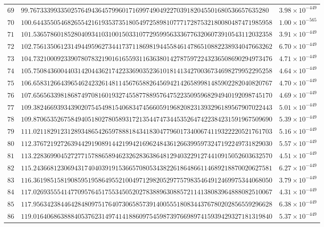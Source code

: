 \documentclass[12pt,reqno]{amsart}
\theoremstyle{remark}
\begin{document}
\begin{longtable}{clc}
$69$ & $99.7673339933502576494364579960171699749049227039182045501680536657635280$ & $3.98\times 10^{-449}$ \\
$70$ & $100.6443550546826554216193537351805497258981077717287532180080487471985958$ & $1.00\times 10^{-565}$ \\
$71$ & $101.5365786018528040934103100150331077295995633367763206073910543112032358$ & $3.91\times 10^{-449}$ \\
$72$ & $102.7561350612314944959627344173711869819445584614786510882238934047663262$ & $6.70\times 10^{-449}$ \\
$73$ & $104.7321000923390780783219016165593116363801427875972243236508690294973476$ & $4.71\times 10^{-449}$ \\
$74$ & $105.7508436004403142044362174223369035236101814134270036734698279952295258$ & $4.64\times 10^{-449}$ \\
$75$ & $106.6583126643965462423261481145676588264569421426589981485902282040820767$ & $4.70\times 10^{-449}$ \\
$76$ & $107.6565633981868749708160193274558778895764752235095968294940192098745170$ & $4.69\times 10^{-449}$ \\
$77$ & $109.3824669393439020754549815406834745660591968208231393296189567907022443$ & $5.01\times 10^{-449}$ \\
$78$ & $109.8706535267584940518027805893172135447473445352647422384231591967509690$ & $5.39\times 10^{-449}$ \\
$79$ & $111.0211829123128934865426597888184341830477960173400674119322220521761703$ & $5.16\times 10^{-449}$ \\
$80$ & $112.3767219272639442919089144219942169624843612663995973247192249731829030$ & $5.57\times 10^{-449}$ \\
$81$ & $113.2283699045272771578865894623262836386481294032291274410915052603632570$ & $4.51\times 10^{-449}$ \\
$82$ & $115.2436681230694317404039191536657080534382261864866114689218870020627581$ & $6.27\times 10^{-449}$ \\
$83$ & $116.3619851581908595195864955210049712982052977579835464912469975344068050$ & $3.79\times 10^{-449}$ \\
$84$ & $117.0269355541477095764517553450520278388963088572114138083964888082510067$ & $4.31\times 10^{-449}$ \\
$85$ & $117.9563423844642848097517640730658573914005551808344376780202856559296628$ & $6.38\times 10^{-449}$ \\
$86$ & $119.0164068638884053762314974141886097545987397669897415939429327181319840$ & $5.37\times 10^{-449}$ \\

\end{longtable}
\end{document}
